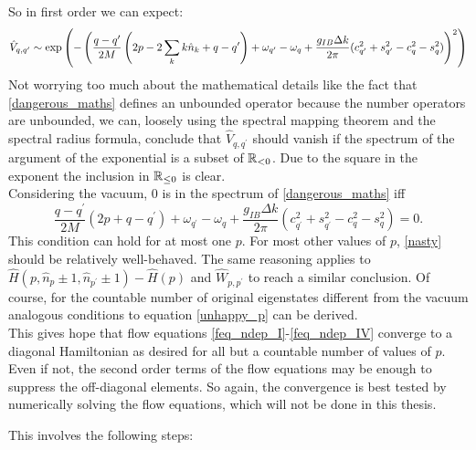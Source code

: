 So in first order we can expect:
\begin{align}\label{nasty}
\hat V_{q,q^\prime}\sim \mathrm{exp}\left(-\left(\frac{q-q^\prime}{2M}\left(2p-2\sum\limits_k k \hat n_k+q-q^\prime\right)+\omega_{q^\prime}-\omega_q + \frac{g_{IB}\Delta k}{2\pi}(c_{q^\prime}^2+s_{q^\prime}^2-c_{q}^2-s_{q}^2)\right)^2\right)
\end{align}
Not worrying too much about the mathematical details like the fact that \ref{dangerous_maths} defines an unbounded operator because the number operators are unbounded, we can, loosely using the spectral mapping theorem \cite{Arendt1984} and the spectral radius formula, conclude that $\hat V_{q,q^\prime}$ should vanish if the spectrum of the argument of the exponential is a subset of $\mathbb{R}_{<0}$. Due to the square in the exponent the inclusion in $\mathbb{R}_{\leq 0}$ is clear.  \\
Considering the vacuum, 0 is in the spectrum of \ref{dangerous_maths} iff 
\begin{equation}\label{unhappy_p}
\frac{q-q^\prime}{2M}\left(2p+q-q^\prime\right)+\omega_{q^\prime}-\omega_q + \frac{g_{IB}\Delta k}{2\pi}(c_{q^\prime}^2+s_{q^\prime}^2-c_{q}^2-s_{q}^2)=0.
\end{equation}
This condition can hold for at most one $p$. For most other values of $p$, \ref{nasty} should be relatively well-behaved.
The same reasoning applies to $\hat H(p,\hat n_p\pm1,\hat n_{p^\prime}\pm 1)-\hat H(p)$ and $\hat W_{p,p^\prime}$ to reach a similar conclusion. Of course, for the countable number of original eigenstates different from the vacuum analogous conditions to equation \ref{unhappy_p} can be derived.\\
This gives hope that flow equations \ref{feq_ndep_I}-\ref{feq_ndep_IV} converge to a diagonal Hamiltonian as desired for all but a countable number of values of $p$. Even if not, the second order terms of the flow equations may be enough to suppress the off-diagonal elements. So again, the convergence is best tested by numerically solving the flow equations, which will not be done in this thesis. \par
This involves the following steps: 
